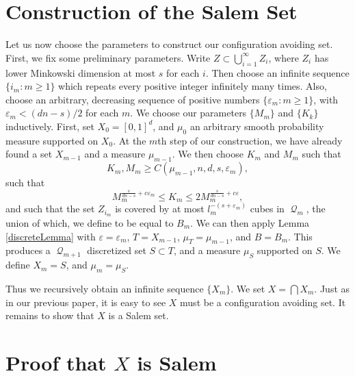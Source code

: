 \documentclass[12pt,reqno]{article}
\numberwithin{equation}{section}
\DeclareMathOperator{\DQ}{\mathcal{Q}}
\begin{document}
\section{Construction of the Salem Set}

Let us now choose the parameters to construct our configuration avoiding set. First, we fix some preliminary parameters. Write $Z \subset \bigcup_{i = 1}^\infty Z_i$, where $Z_i$ has lower Minkowski dimension at most $s$ for each $i$. Then choose an infinite sequence $\{ i_m : m \geq 1 \}$ which repeats every positive integer infinitely many times. Also, choose an arbitrary, decreasing sequence of positive numbers $\{ \varepsilon_m : m \geq 1 \}$, with $\varepsilon_m < (dn - s)/2$ for each $m$. We choose our parameters $\{ M_m \}$ and $\{ K_k \}$ inductively. First, set $X_0 = [0,1]^d$, and $\mu_0$ an arbitrary smooth probability measure supported on $X_0$. At the $m$th step of our construction, we have already found a set $X_{m-1}$ and a measure $\mu_{m-1}$. We then choose $K_m$ and $M_m$ such that
%
\[ K_m, M_m \geq C(\mu_{m-1}, n, d, s, \varepsilon_m), \]
%
such that
%
\[ M_m^{\frac{s}{dn-s} + c\varepsilon_m} \leq K_m \leq 2 M_m^{\frac{s}{dn-s} + c\varepsilon}, \]
%
and such that the set $Z_{i_m}$ is covered by at most $l_m^{-(s + \varepsilon_m)}$ cubes in $\DQ_m$, the union of which, we define to be equal to $B_m$. We can then apply Lemma \ref{discreteLemma} with $\varepsilon = \varepsilon_m$, $T = X_{m-1}$, $\mu_T = \mu_{m-1}$, and $B = B_m$. This produces a $\DQ_{m+1}$ discretized set $S \subset T$, and a measure $\mu_S$ supported on $S$. We define $X_m = S$, and $\mu_m = \mu_S$.

Thus we recursively obtain an infinite sequence $\{ X_m \}$. We set $X = \bigcap X_m$. Just as in our previous paper, it is easy to see $X$ must be a configuration avoiding set. It remains to show that $X$ is a Salem set.

\section{Proof that $X$ is Salem}
\end{document}
